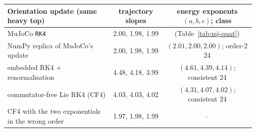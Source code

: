 \begin{tabular}{lcc}
\toprule
Orientation update (same heavy top) & trajectory slopes & energy exponents $(a,b,c)$; class \\
\midrule
MuJoCo \texttt{RK4} & 2.00, 1.98, 1.99 & (Table~\ref{tab:mj-quat}) \\
NumPy replica of MuJoCo's update & 2.00, 1.98, 1.99 & $(2.01,2.00,2.00)$; order-2 24 \\
embedded RK4 + renormalisation & 4.48, 4.18, 3.99 & $(4.61,4.39,4.14)$; consistent 24 \\
commutator-free Lie RK4 (CF4) & 4.03, 4.03, 4.02 & $(4.31,4.07,4.02)$; consistent 24 \\
CF4 with the two exponentials in the wrong order & 1.97, 1.98, 1.99 & -- \\
\bottomrule
\end{tabular}
